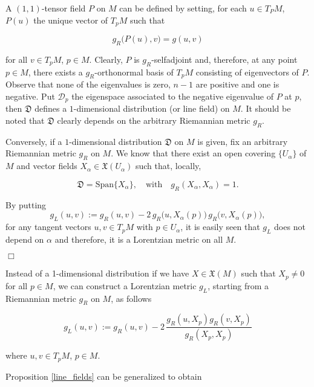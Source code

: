 A $(1,1)$-tensor field $P$ on $M$ can be defined by setting, for each $u \in T_PM$, $P(u)$ the unique vector of $T_pM$ such that

\[

g_R\big(P(u),v\big)=g(u,v)

\]

for all $v \in T_pM$, $p \in M$. Clearly, $P$ is $g_R$-selfadjoint and, therefore, at any point $p \in M$, there exists a $g_R$-orthonormal basis of $T_pM$ consisting of eigenvectors of $P$. Observe that none of the eigenvalues is zero, $n-1$ are positive and one is negative. Put $\mathcal{D}_p$ the eigenspace associated to the negative eigenvalue of $P$ at $p$, then $\mathfrak{D}$ defines a $1$-dimensional distribution (or line field) on $M$. It should be noted that $\mathfrak{D}$ clearly depends on the arbitrary Riemannian metric $g_R$.


Conversely, if a $1$-dimensional distribution $\mathfrak{D}$ on $M$ is given, fix an arbitrary Riemannian metric $g_R$ on $M$. We know that there exist an open covering $\{U_{\alpha}\}$ of $M$ and vector fields $X_\alpha \in \mathfrak{X}(U_\alpha)$ such that, locally,

\[

\mathfrak{D}=\mathrm {Span}\{X_{\alpha}\}, \quad \mathrm{with} \quad

g_R(X_{\alpha},X_{\alpha})=1.

\]

By putting $$g_{L}(u,v):=g_{R}(u,v)-2\,g_{R}\big(u,X_{\alpha}(p)\big)\,g_{R}\big(v,X_{\alpha}(p)\big),$$ for any  tangent vectors $u,v \in T_{p}M$ with $p\in U_\alpha$, it is easily seen that $g_{L}$ does not depend on $\alpha$ and therefore, it is a Lorentzian metric on all $M$.


\hfill{$\Box$}


\begin{rem}{\rm Instead of a 1-dimensional distribution if we have $X \in \mathfrak{X}(M)$ such that $X_p \neq 0$ for all $p \in M$, we can construct a Lorentzian metric $g_L$, starting from a Riemannian metric $g_R$ on $M$, as follows

\[

g_{L}(u,v):=g_{R}(u,v)-2\,\frac{g_R(u,X_p)g_R(v,X_p)}{g_R(X_p,X_p)}

\]

where $u,v \in T_{p}M$, $p\in M$.}

\end{rem}


Proposition \ref{line_fields} can be generalized to obtain \cite{greub72}


